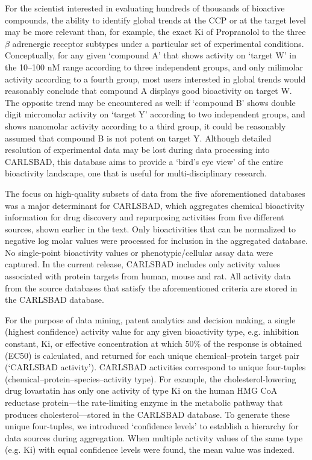For the scientist interested in evaluating hundreds of thousands of bioactive compounds, the ability to identify global trends at the CCP or at the target level may be more relevant than, for example, the exact Ki of Propranolol to the three $\beta$ adrenergic receptor subtypes under a particular set of experimental conditions. Conceptually, for any given ‘compound A’ that shows activity on ‘target W’ in the 10–100 nM range according to three independent groups, and only milimolar activity according to a fourth group, most users interested in global trends would reasonably conclude that compound A displays good bioactivity on target W. The opposite trend may be encountered as well: if ‘compound B’ shows double digit micromolar activity on ‘target Y’ according to two independent groups, and shows nanomolar activity according to a third group, it could be reasonably assumed that compound B is not potent on target Y. Although detailed resolution of experimental data may be lost during data processing into CARLSBAD, this database aims to provide a ‘bird’s eye view’ of the entire bioactivity landscape, one that is useful for multi-disciplinary research.

The focus on high-quality subsets of data from the five aforementioned databases was a major determinant for CARLSBAD, which aggregates chemical bioactivity information for drug discovery and repurposing activities from five different sources, shown earlier in the text. Only bioactivities that can be normalized to negative log molar values were processed for inclusion in the aggregated database. No single-point bioactivity values or phenotypic/cellular assay data were captured. In the current release, CARLSBAD includes only activity values associated with protein targets from human, mouse and rat. All activity data from the source databases that satisfy the aforementioned criteria are stored in the CARLSBAD database.

For the purpose of data mining, patent analytics and decision making, a single (highest confidence) activity value for any given bioactivity type, e.g. inhibition constant, Ki, or effective concentration at which 50\% of the response is obtained (EC50) is calculated, and returned for each unique chemical–protein target pair (‘CARLSBAD activity’). CARLSBAD activities correspond to unique four-tuples (chemical–protein–species–activity type). For example, the cholesterol-lowering drug lovastatin has only one activity of type Ki on the human HMG CoA reductase protein—the rate-limiting enzyme in the metabolic pathway that produces cholesterol—stored in the CARLSBAD database. To generate these unique four-tuples, we introduced ‘confidence levels’ to establish a hierarchy for data sources during aggregation. When multiple activity values of the same type (e.g. Ki) with equal confidence levels were found, the mean value was indexed.

